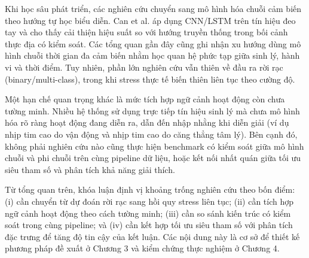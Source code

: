 Khi học sâu phát triển, các nghiên cứu chuyển sang mô hình hóa chuỗi cảm biến theo hướng tự học biểu diễn. Can et al. \cite{can2019stress} áp dụng CNN/LSTM trên tín hiệu đeo tay và cho thấy cải thiện hiệu suất so với hướng truyền thống trong bối cảnh thực địa có kiểm soát. Các tổng quan gần đây \cite{garciaceja2018stress, dalmeida2021stress, rashid2024stress} cũng ghi nhận xu hướng dùng mô hình chuỗi thời gian đa cảm biến nhằm học quan hệ phức tạp giữa sinh lý, hành vi và thời điểm. Tuy nhiên, phần lớn nghiên cứu vẫn thiên về đầu ra rời rạc (binary/multi-class), trong khi stress thực tế biến thiên liên tục theo cường độ.

Một hạn chế quan trọng khác là mức tích hợp ngữ cảnh hoạt động còn chưa tường minh. Nhiều hệ thống sử dụng trực tiếp tín hiệu sinh lý mà chưa mô hình hóa rõ ràng hoạt động đang diễn ra, dẫn đến nhập nhằng khi diễn giải (ví dụ nhịp tim cao do vận động và nhịp tim cao do căng thẳng tâm lý). Bên cạnh đó, không phải nghiên cứu nào cũng thực hiện benchmark có kiểm soát giữa mô hình chuỗi và phi chuỗi trên cùng pipeline dữ liệu, hoặc kết nối nhất quán giữa tối ưu siêu tham số và phân tích khả năng giải thích.

Từ tổng quan trên, khóa luận định vị khoảng trống nghiên cứu theo bốn điểm: (i) cần chuyển từ dự đoán rời rạc sang hồi quy stress liên tục; (ii) cần tích hợp ngữ cảnh hoạt động theo cách tường minh; (iii) cần so sánh kiến trúc có kiểm soát trong cùng pipeline; và (iv) cần kết hợp tối ưu siêu tham số với phân tích đặc trưng để tăng độ tin cậy của kết luận. Các nội dung này là cơ sở để thiết kế phương pháp đề xuất ở Chương 3 và kiểm chứng thực nghiệm ở Chương 4.

